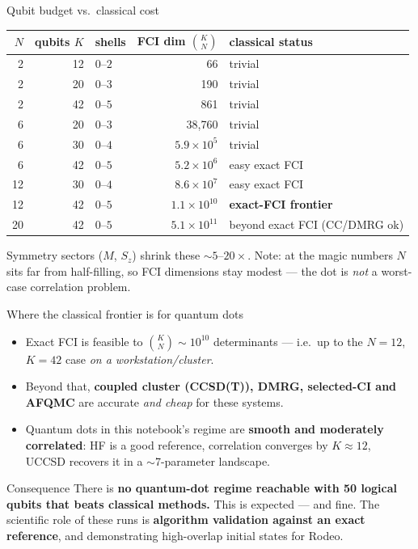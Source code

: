 \documentclass[aspectratio=169,11pt]{beamer}
\begin{document}
\begin{frame}{Qubit budget vs.\ classical cost}
\begin{center}\small
\renewcommand{\arraystretch}{1.18}
\begin{tabular}{@{}rrlrl@{}}
\toprule
$N$ & \textbf{qubits $K$} & shells & FCI dim $\binom{K}{N}$ & classical status \\
\midrule
2  & 12 & $0$--$2$ & 66            & trivial \\
2  & 20 & $0$--$3$ & 190           & trivial \\
2  & 42 & $0$--$5$ & 861           & trivial \\
6  & 20 & $0$--$3$ & 38{,}760      & trivial \\
6  & 30 & $0$--$4$ & $5.9\times10^{5}$ & trivial \\
6  & 42 & $0$--$5$ & $5.2\times10^{6}$ & easy exact FCI \\
12 & 30 & $0$--$4$ & $8.6\times10^{7}$ & easy exact FCI \\
12 & 42 & $0$--$5$ & $1.1\times10^{10}$ & \textbf{exact-FCI frontier} \\
20 & 42 & $0$--$5$ & $5.1\times10^{11}$ & beyond exact FCI (CC/DMRG ok) \\
\bottomrule
\end{tabular}
\end{center}
\vspace{2pt}
{\small\color{qngray} Symmetry sectors ($M$, $S_z$) shrink these $\sim 5$--$20\times$.
Note: at the magic numbers $N$ sits far from half-filling, so FCI dimensions stay
modest --- the dot is \emph{not} a worst-case correlation problem.}
\end{frame}

\begin{frame}{Where the classical frontier is for quantum dots}
\begin{itemize}
  \item Exact FCI is feasible to $\binom{K}{N}\!\sim\!10^{10}$ determinants ---
        i.e.\ up to the $N{=}12$, $K{=}42$ case \emph{on a workstation/cluster}.
  \item Beyond that, \textbf{coupled cluster (CCSD(T)), DMRG, selected-CI and AFQMC}
        are accurate \emph{and cheap} for these systems.
  \item Quantum dots in this notebook's regime are \textbf{smooth and
        moderately correlated}: HF is a good reference, correlation converges by
        $K\!\approx\!12$, UCCSD recovers it in a $\sim$7-parameter landscape.
\end{itemize}
\begin{alertblock}{Consequence}
There is \textbf{no quantum-dot regime reachable with 50 logical qubits that beats
classical methods.} This is expected --- and fine. The scientific role of these runs
is \textbf{algorithm validation against an exact reference}, and demonstrating
high-overlap initial states for Rodeo.
\end{alertblock}
\end{frame}
\end{document}
